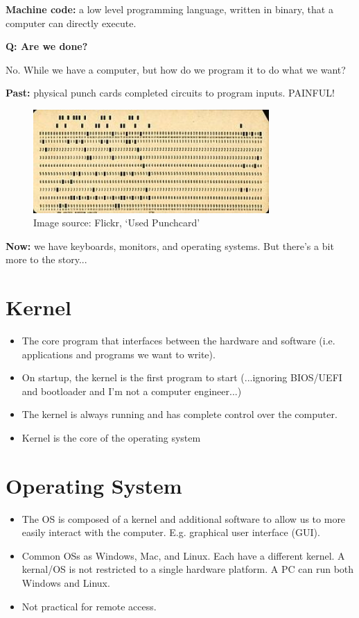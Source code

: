 \documentclass[12pt]{article}
\numberwithin{equation}{section}
\begin{document}
\textbf{Machine code: }a low level programming language, written in binary, that a computer can directly execute. 

\textbf{Q: Are we done?}

No. While we have a computer, but how do we program it to do what we want?

\textbf{Past: }physical punch cards completed circuits to program inputs. PAINFUL!

\begin{figure}[H]
	\centering
	\includegraphics[width=9cm] {punch}
	\caption{Image source: Flickr, `Used Punchcard'}
\end{figure}

\textbf{Now: }we have keyboards, monitors, and operating systems. But there's a bit more to the story...

\section{Kernel}
\begin{itemize}
    \item The core program that interfaces between the hardware and software (i.e. applications and programs we want to write).
    \item On startup, the kernel is the first program to start (...ignoring BIOS/UEFI and bootloader and I'm not a computer engineer...)
    \item The kernel is always running and has complete control over the computer.
    \item Kernel is the core of the operating system
\end{itemize}

\section{Operating System}
\begin{itemize}
    \item The OS is composed of a kernel and additional software to allow us to more easily interact with the computer. E.g. graphical user interface (GUI).
    \item Common OSs as Windows, Mac, and Linux. Each have a different kernel. A kernal/OS is not restricted to a single hardware platform. A PC can run both Windows and Linux.
    \item Not practical for remote access. 
\end{itemize}
\end{document}
